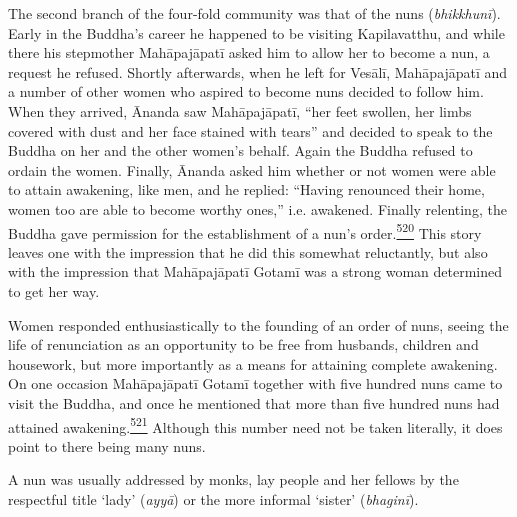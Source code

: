 The second branch of the four-fold community was that of the nuns
(\emph{bhikkhunī}). Early in the Buddha's career he happened to be
visiting Kapilavatthu, and while there his stepmother Mahāpajāpatī asked
him to allow her to become a nun, a request he refused. Shortly
afterwards, when he left for Vesālī, Mahāpajāpatī and a number of other
women who aspired to become nuns decided to follow him. When they
arrived, Ānanda saw Mahāpajāpatī, ``her feet swollen, her limbs covered
with dust and her face stained with tears'' and decided to speak to the
Buddha on her and the other women's behalf. Again the Buddha refused to
ordain the women. Finally, Ānanda asked him whether or not women were
able to attain awakening, like men, and he replied: ``Having renounced
their home, women too are able to become worthy ones,'' i.e. awakened.
Finally relenting, the Buddha gave permission for the establishment of a
nun's
order.\label{footprints_split_014.html_fnref520}\hyperref[footprints_split_025.htmlux5cux23fn520]{\textsuperscript{520}}
This story leaves one with the impression that he did this somewhat
reluctantly, but also with the impression that Mahāpajāpatī Gotamī was a
strong woman determined to get her way.

Women responded enthusiastically to the founding of an order of nuns,
seeing the life of renunciation as an opportunity to be free from
husbands, children and housework, but more importantly as a means for
attaining complete awakening. On one occasion Mahāpajāpatī Gotamī
together with five hundred nuns came to visit the Buddha, and once he
mentioned that more than five hundred nuns had attained
awakening.\label{footprints_split_014.html_fnref521}\hyperref[footprints_split_025.htmlux5cux23fn521]{\textsuperscript{521}}
Although this number need not be taken literally, it does point to there
being many nuns.

A nun was usually addressed by monks, lay people and her fellows by the
respectful title `lady' (\emph{ayyā}) or the more informal `sister'
(\emph{bhaginī}).

